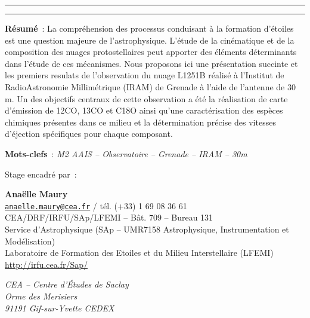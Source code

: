 \documentclass[a4paper,10pt,french]{article}
\begin{document}
\begin{center}

    \vspace{1.5cm}

    \rule[11pt]{5cm}{0.5pt}

    \textbf{\huge \thetitle}

    \rule{5cm}{0.5pt}

    \vspace{1.5cm}

    \parbox{15cm}{\textbf{Résumé} :
    La compréhension des processus conduisant à la formation d'étoiles est une question majeure de l'astrophysique. L'étude de la cinématique et de la composition des nuages protostellaires peut apporter des éléments déterminants dans l'étude de ces mécanismes. Nous proposons ici une présentation succinte et les premiers resulats de l'observation du nuage L1251B réalisé à l'Institut de RadioAstronomie Millimétrique (IRAM) de Grenade à l'aide de l'antenne de 30 m. Un des objectifs centraux de cette observation a été la réalisation de carte d'émission de 12CO, 13CO et C18O ainsi qu'une caractérisation des espèces chimiques présentes dans ce milieu et la détermination précise des vitesses d'éjection spécifiques pour chaque composant.
    }
    

    \vspace{0.5cm}

    \parbox{15cm}{
        \textbf{Mots-clefs} : \it M2 AAIS – Observatoire – Grenade – IRAM – 30m
    }

    \vspace{0.5cm}

    \parbox{15cm}{
        Stage encadré par :

        \textbf{Anaëlle Maury} \\
        \href{mailto:anaelle.maury@cea.fr}{\tt anaelle.maury@cea.fr} / tél. (+33) 1 69 08 36 61 \\
        CEA/DRF/IRFU/SAp/LFEMI – Bât. 709 – Bureau 131 \\
        Service d’Astrophysique (SAp – UMR7158 Astrophysique, Instrumentation et Modélisation) \\
        Laboratoire de Formation des Etoiles et du Milieu Interstellaire (LFEMI) \\
        \url{http://irfu.cea.fr/Sap/}

        \textit{%
            CEA – Centre d’Études de Saclay \\
            Orme des Merisiers \\
            91191 Gif-sur-Yvette CEDEX
        }
    }


\end{center}
\end{document}

